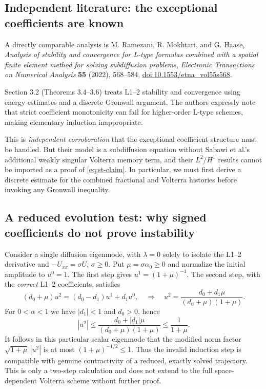 \documentclass[11pt,a4paper]{amsart}
\theoremstyle{remark}
\theoremstyle{plain}
\theoremstyle{remark}
\numberwithin{equation}{section}
\begin{document}
\subsection{Independent literature: the exceptional coefficients are known}
A directly comparable analysis is M. Ramezani, R. Mokhtari, and G. Haase, \emph{Analysis of stability and convergence for L-type formulas combined with a spatial finite element method for solving subdiffusion problems}, \emph{Electronic Transactions on Numerical Analysis} \textbf{55} (2022), 568--584,
\href{https://doi.org/10.1553/etna_vol55s568}{doi:10.1553/etna\_vol55s568}.

Section 3.2 (Theorems 3.4--3.6) treats L1--2 stability and convergence using energy estimates and a discrete Gronwall argument. The authors expressly note that strict coefficient monotonicity can fail for higher-order L-type schemes, making elementary induction inappropriate.

This is \emph{independent corroboration} that the exceptional coefficient structure must be handled. But their model is a subdiffusion equation without Sabawi et al.'s additional weakly singular Volterra memory term, and their $L^2$/$H^1$ results cannot be imported as a proof of \eqref{eq:st-claim}. In particular, we must first derive a discrete estimate for the combined fractional and Volterra histories before invoking any Gronwall inequality.

\subsection{A reduced evolution test: why signed coefficients do not prove instability}
Consider a single diffusion eigenmode, with $\lambda=0$ solely to isolate the L1--2 derivative and $-U_{xx}=\sigma U$, $\sigma\ge0$. Put $\mu=\sigma\alpha_0\ge0$ and normalize the initial amplitude to $u^0=1$. The first step gives $u^1=(1+\mu)^{-1}$. The second step, with the \emph{correct} L1--2 coefficients, satisfies
\begin{equation}\label{eq:st-scalar}
 (d_0+\mu)u^2=(d_0-d_1)u^1+d_1u^0,
 \quad\Longrightarrow\quad
 u^2=\frac{d_0+d_1\mu}{(d_0+\mu)(1+\mu)}.
\end{equation}
For $0<\alpha<1$ we have $|d_1|<1$ and $d_0>0$, hence
\[
 |u^2|\le\frac{d_0+|d_1|\mu}{(d_0+\mu)(1+\mu)}
 \le\frac{1}{1+\mu}.
\]
It follows in this particular scalar eigenmode that the modified norm factor $\sqrt{1+\mu}\,|u^2|$ is at most $(1+\mu)^{-1/2}\le1$. Thus the invalid induction step is compatible with genuine contractivity of a reduced, exactly solved trajectory. This is only a two-step calculation and does not extend to the full space-dependent Volterra scheme without further proof.
\end{document}
